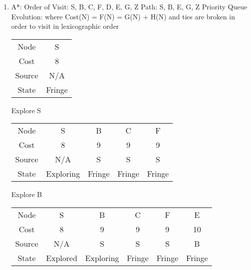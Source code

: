 \documentclass{article}
\begin{document}
\begin{enumerate}
        
        \item A*:
        \newline
        Order of Visit: S, B, C, F, D, E, G, Z
        \newline
        Path: S, B, E, G, Z
        \newline
        \newline
        Priority Queue Evolution:
        \newline where Cost(N) = F(N) = G(N) + H(N)
        \newline and ties are broken in order to visit in lexicographic order 
        \newline
        \newline
        \begin{left}
            \begin{tabular}{c|c}
            \hline
                Node & S \\
                Cost & 8 \\
                Source & N/A \\
                State & Fringe \\
            \hline
            \end{tabular}
        \end{left}
        \newline
        \newline
        
        
        Explore S
        \newline
        \begin{left}
            \begin{tabular}{c|c|c|c|c}
            \hline
                Node & S & B & C & F \\
                Cost & 8 & 9 & 9 & 9 \\
                Source & N/A & S & S & S \\
                State & Exploring & Fringe & Fringe & Fringe\\
            \hline
            \end{tabular}
        \end{left}
        \newline
        \newline
        
        
        Explore B
        \newline
        \begin{left}
            \begin{tabular}{c|c|c|c|c|c}
            \hline
                Node & S & B & C & F & E\\
                Cost & 8 & 9 & 9 & 9 & 10\\
                Source & N/A & S & S & S & B \\
                State & Explored & Exploring & Fringe & Fringe & Fringe\\
            \hline
            \end{tabular}
        \end{left}
        \newline
        \newline
        

\end{enumerate}
\end{document}

